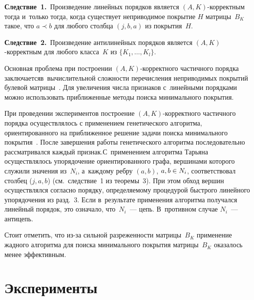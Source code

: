 \begin{multicols}{2}
  
  \noindent
  \textbf{Следствие~1.}\ Произведение линейных порядков
  является 
$(A,K)$-кор\-рект\-ным тогда и~только тогда, когда существует 
неприводимое покрытие $H$ мат\-ри\-цы~$B_K$ такое, что $a\prec b$ для 
любого столбца $(j,b,a)$ из покрытия~$H$.
  
  
  \noindent
  \textbf{Следствие~2.}\ Произведение антилинейных порядков
  является  
$(A,K)$-кор\-рект\-ным для любого класса~$K$ из $\{K_1, \ldots , K_l\}$.
  
  
  Основная проблема при построении $(A,K)$-кор\-рект\-но\-го частичного 
порядка заключается\linebreak в~вычислительной слож\-ности перечисления 
неприводимых покрытий булевой мат\-ри\-цы~\cite{7-duk}. Для увеличения чис\-ла 
признаков с~линейными порядками можно использовать приближенные 
методы поиска минимального покрытия. 
  
  При проведении экспериментов построение $(A,K)$-кор\-рект\-но\-го 
частичного порядка осуществлялось с применением генетического алгоритма, 
ориентированного на приближенное решение задачи поиска минимального 
покрытия~\cite{8-duk}. После завершения работы генетического алгоритма 
последовательно рассматривался каждый признак.\linebreak С~применением алгоритма 
Тарьяна~\cite{9-duk} осуществлялось упорядочение ориентированного графа, 
вершинами которого служили значения из~$N_i$, а~каж\-до\-му ребру $(a,b)$, 
$a,b\hm\in N_i$, соответствовал \mbox{столбец} ($j,a,b$) (см.\ следствие~1 из 
теоремы~3). При этом обход вершин осуществлялся согласно порядку, 
определяемому процедурой быстрого линейного упорядочения из разд.~3. 
Если в~результате применения алгоритма получался линейный порядок, это 
означало, что~$N_i$~--- цепь. В~противном случае $N_i$~--- антицепь.
  
  Стоит отметить, что из-за сильной разре\-жен\-ности мат\-ри\-цы~$B_K$ 
применение жадного алгоритма для поиска минимального покрытия  
мат\-ри\-цы~$B_K$ оказалось менее эффективным. 

\section{Эксперименты}



\end{multicols}
